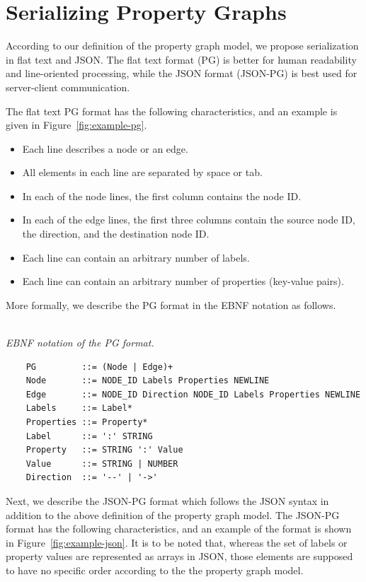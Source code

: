 \documentclass[runningheads]{llncs}
\begin{document}
\section{Serializing Property Graphs}
According to our definition of the property graph model, we propose serialization in flat text and JSON. The flat text format (PG) is better for human readability and line-oriented processing, while the JSON format (JSON-PG) is best used for server-client communication.

The flat text PG format has the following characteristics, and an example is given in Figure~\ref{fig:example-pg}.

\begin{itemize}
    \item Each line describes a node or an edge.
    \item All elements in each line are separated by space or tab.
    \item In each of the node lines, the first column contains the node ID.
    \item In each of the edge lines, the first three columns contain the source node ID, the direction, and the destination node ID.
    \item Each line can contain an arbitrary number of labels.
    \item Each line can contain an arbitrary number of properties (key-value pairs).
\end{itemize}

More formally, we describe the PG format in the EBNF notation as follows.

\begin{defi}[PG Format]
\leavevmode \vspace{1mm} \\
\emph{EBNF notation of the PG format.}
\begin{scriptsize}
\begin{verbatim}
    PG         ::= (Node | Edge)+
    Node       ::= NODE_ID Labels Properties NEWLINE
    Edge       ::= NODE_ID Direction NODE_ID Labels Properties NEWLINE
    Labels     ::= Label*
    Properties ::= Property*
    Label      ::= ':' STRING
    Property   ::= STRING ':' Value
    Value      ::= STRING | NUMBER
    Direction  ::= '--' | '->'
\end{verbatim}
\end{scriptsize}
\end{defi}

Next, we describe the JSON-PG format which follows the JSON syntax in addition to the above definition of the property graph model. The JSON-PG format has the following characteristics, and an example of the format is shown in Figure~\ref{fig:example-json}. It is to be noted that, whereas the set of labels or property values are represented as arrays in JSON, those elements are supposed to have no specific order according to the the property graph model.
\end{document}
